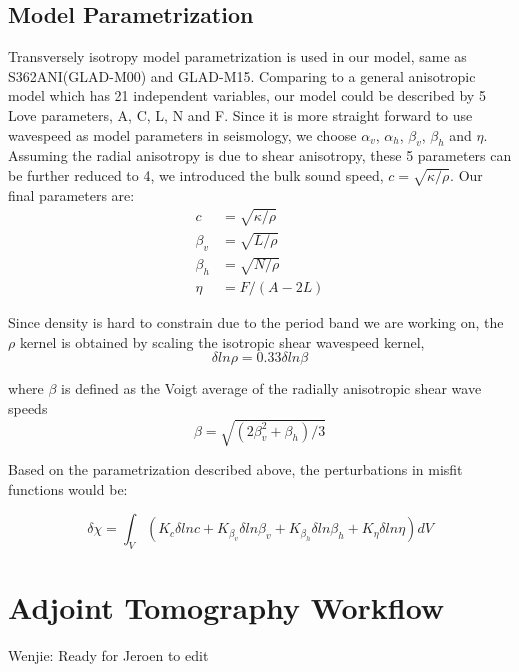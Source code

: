 \documentclass[extra,mreferee]{gji}
\begin{document}
\subsection{Model Parametrization}
Transversely isotropy model parametrization is used in our model, same as S362ANI(GLAD-M00)
and GLAD-M15. Comparing to a general anisotropic model which has 21 independent variables,
our model could be described by 5 Love parameters, A, C, L, N and F\citep{love2013treatise}.
Since it is more straight forward to use  wavespeed as model parameters in seismology,
we choose $\alpha_v$, $\alpha_h$, $\beta_v$, $\beta_h$ and $\eta$.
Assuming the radial anisotropy is due to shear anisotropy, these 5 parameters
can be further reduced to 4, we introduced the bulk sound speed,
$c=\sqrt{\kappa/\rho}$. Our final parameters are:\\
\begin{align*}
      c &= \sqrt{\kappa/\rho} \\
\beta_v &= \sqrt{L/\rho} \\
\beta_h &= \sqrt{N/\rho} \\
\eta & = F/(A-2L)
\end{align*}

Since density is hard to constrain due to the period band we are working on, the $\rho$ kernel is obtained by scaling the isotropic shear wavespeed kernel\citep{montagner1989petrological},\\
\begin{equation*}
    \delta ln\rho = 0.33\delta ln\beta
\end{equation*}

where $\beta$ is defined as the Voigt average of the radially anisotropic shear wave speeds\citep{babuska1991seismic}
$$\beta = \sqrt{(2\beta_v^2 + \beta_h)/3}$$

Based on the parametrization described above, the perturbations in misfit functions would be:

\begin{equation*}
    \delta \chi = \int_V
      (K_c\delta lnc + K_{\beta_v}\delta ln\beta_v + K_{\beta_h}\delta ln\beta_h +
      K_\eta \delta ln\eta) dV
\end{equation*}

\section{Adjoint Tomography Workflow}

{\color{Red} Wenjie: Ready for Jeroen to edit}
\end{document}
